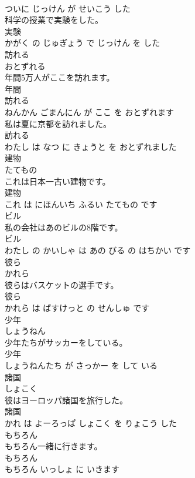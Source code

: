 \documentclass[8pt]{extreport}
\begin{document}
\begin{CJK}{UTF8}{min}
\\	ついに じっけん が せいこう した			
\\	科学の授業で実験をした。	
\\	実験 
\\	かがく の じゅぎょう で じっけん を した			
\\	訪れる	
\\	おとずれる			
\\	年間5万人がここを訪れます。	
\\	年間 
\\	訪れる 
\\	ねんかん ごまんにん が ここ を おとずれます			
\\	私は夏に京都を訪れました。	
\\	訪れる 
\\	わたし は なつ に きょうと を おとずれました			
\\	建物	
\\	たてもの			
\\	これは日本一古い建物です。	
\\	建物 
\\	これ は にほんいち ふるい たてもの です			
\\	ビル	
\\	私の会社はあのビルの8階です。	
\\	ビル 
\\	わたし の かいしゃ は あの びる の はちかい です			
\\	彼ら	
\\	かれら			
\\	彼らはバスケットの選手です。	
\\	彼ら 
\\	かれら は ばすけっと の せんしゅ です			
\\	少年	
\\	しょうねん			
\\	少年たちがサッカーをしている。	
\\	少年 
\\	しょうねんたち が さっかー を して いる			
\\	諸国	
\\	しょこく			
\\	彼はヨーロッパ諸国を旅行した。	
\\	諸国 
\\	かれ は よーろっぱ しょこく を りょこう した			
\\	もちろん	
\\	もちろん一緒に行きます。	
\\	もちろん 
\\	もちろん いっしょ に いきます			

\end{CJK}
\end{document}
